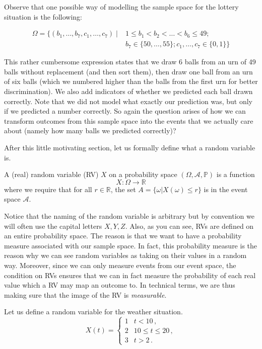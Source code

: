 \documentclass[a4paper,11pt,leqno]{report}
\begin{document}
Observe that one possible way of modelling the sample space for the lottery situation is the following:

\begin{align}
\Omega = \{(b_{1}, \ldots, b_{7}, c_{1}, \ldots, c_{7}) \mid &1 \leq b_{1} < b_2 < \ldots < b_{6} \leq 49;\\
&b_{7} \in \{50, \ldots, 55\}; c_{1}, \ldots, c_{7} \in \{0,1\} \} \nonumber
\end{align}

This rather cumbersome expression states that we draw 6 balls from an urn of 49 balls without replacement (and then sort them), then draw one ball from an urn of six balls (which we numbered higher than the balls from the first
urn for better discrimination). We also add indicators of whether we predicted each ball drawn correctly. Note that we did not model what exactly our prediction was, but only if we predicted a number correctly. So again the question arises of how we can transform outcomes from this sample space into
the events that we actually care about (namely how many balls we predicted correctly)?

\medskip
After this little motivating section, let us formally define what a random variable is.

\begin{Definition}
A (real) random variable (RV) $X$ on a probability space $(\Omega, \mathcal{A}, \mathbb{P})$ is a function
$$ X: \Omega \rightarrow \mathbb{R} $$
where we require that for
all $ r \in \mathbb{R} $, the set $ A = \{\omega| X(\omega) \leq r\} $ is in the event space $ \mathcal{A}$.
\end{Definition}

Notice that the naming of the random variable is arbitrary but by convention we will often use the capital letters
$ X,Y,Z $. Also, as you can see, RVs are defined on an entire probability space. The reason is that
we want to have a probability measure associated with our sample space. 
In fact, this probability measure is the reason why we can see random variables as taking on their values
in a random way. Moreover, since we can only measure events from our event space, the condition on RVs
ensures that we can in fact measure the probability of each real value which a RV may map an outcome to.
In technical terms, we are thus making sure that the image of the RV is \textit{measurable}.

Let us define a random variable for the weather situation. 
\begin{equation} \label{weatherRV}
X(t) = 
\begin{cases}
1 & t < 10 \, , \\
2 & 10 \leq t \leq 20 \, ,\\
3 & t > 2 \, .
\end{cases}
\end{equation}
\end{document}
